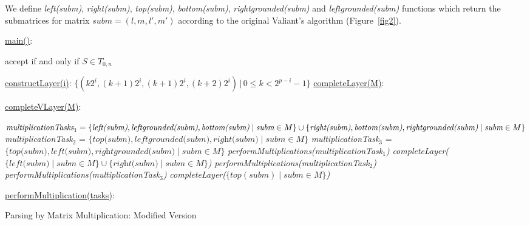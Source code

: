We define \textit{left(subm)}, \textit{right(subm)}, \textit{top(subm)}, \textit{bottom(subm)}, \linebreak \textit{rightgrounded(subm)} and \textit{leftgrounded(subm)} functions which return the submatrices for matrix $\textit{subm} = (l, m, l', m')$ according to the original Valiant's algorithm (Figure~\ref{fig2}).

\begin{algorithm}[h]
\SetAlgoNoLine
{}
\underline{main()}{:}{

 accept if and only if $S \in T_{0, n}$
 \BlankLine
 }

\underline{constructLayer(i)}{:}{
 \BlankLine
 $\{(k2^i, (k+1)2^i, (k + 1)2^i, (k+2)2^i) \, |\, 0 \le k < 2^{p - i} - 1\}$
 \BlankLine
    }
\underline{completeLayer(M)}{:}{
\BlankLine
{}
\BlankLine
}

\underline{completeVLayer(M)}{:}{
 \BlankLine
 $\textit{multiplicationTasks}_1 = \linebreak
    \{\textit{left(subm)}, \textit{leftgrounded(subm)}, \textit{bottom(subm)} \mid \textit{subm} \in M \} \cup \linebreak  \{\textit{right(subm)}, \textit{bottom(subm)}, \textit{rightgrounded(subm)} \mid \textit{subm} \in M\}$\;
 \BlankLine
 \textit{multiplicationTask$_2$} = $\{\textit{top(subm)}, \textit{leftgrounded(subm)}, \textit{right(subm)} \mid \textit{subm} \in M\}$\;
 \BlankLine
 \textit{multiplicationTask$_3$} = $\{\textit{top(subm)}, \textit{left(subm)}, \textit{rightgrounded(subm)} \mid \textit{subm} \in M\}$\;
 \BlankLine
 \textit{performMultiplications(multiplicationTask$_1$)}\;
 \textit{completeLayer($\{\textit{left(subm)} \mid subm \in M \} \cup \{\textit{right(subm)} \mid \textit{subm} \in M \}$)}\;
 \textit{performMultiplications(multiplicationTask$_2$)}\;
 \textit{performMultiplications(multiplicationTask$_3$)}\;
 \textit{completeLayer($\{top(subm) \mid subm \in M \}$)}

 }
 \BlankLine

 \underline{performMultiplication(tasks)}{:}{\\
 }

\caption{Parsing by Matrix Multiplication: Modified Version}
\label{algo:modified}
\end{algorithm}


